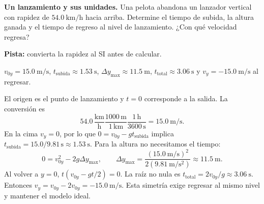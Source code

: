 \begin{ejercicio}
\textbf{Un lanzamiento y sus unidades.} Una pelota abandona un lanzador vertical con rapidez de \(\SI{54.0}{\kilo\meter\per\hour}\) hacia arriba. Determine el tiempo de subida, la altura ganada y el tiempo de regreso al nivel de lanzamiento. ¿Con qué velocidad regresa?

\textbf{Pista:} convierta la rapidez al SI antes de calcular.
\end{ejercicio}
\begin{respuesta}
\(v_{0y}=\SI{15.0}{\meter\per\second}\), \(t_{\text{subida}}\approx\SI{1.53}{\second}\), \(\Delta y_{\max}\approx\SI{11.5}{\meter}\), \(t_{\text{total}}\approx\SI{3.06}{\second}\) y \(v_y=-\SI{15.0}{\meter\per\second}\) al regresar.
\end{respuesta}
\begin{explicacion}
El origen es el punto de lanzamiento y \(t=0\) corresponde a la salida. La conversión es
\[ 54.0\,\frac{\si{\kilo\meter}}{\si{\hour}}\frac{1000\,\si{\meter}}{1\,\si{\kilo\meter}}\frac{1\,\si{\hour}}{3600\,\si{\second}}=\SI{15.0}{\meter\per\second}. \]
En la cima \(v_y=0\), por lo que \(0=v_{0y}-gt_{\text{subida}}\) implica \(t_{\text{subida}}=15.0/9.81\,\si{\second}\approx\SI{1.53}{\second}\). Para la altura no necesitamos el tiempo:
\[ 0=v_{0y}^2-2g\Delta y_{\max},\qquad \Delta y_{\max}=\frac{(\SI{15.0}{\meter\per\second})^2}{2(\SI{9.81}{\meter\per\second\squared})}\approx\SI{11.5}{\meter}. \]
Al volver a \(y=0\), \(t(v_{0y}-gt/2)=0\). La raíz no nula es \(t_{\text{total}}=2v_{0y}/g\approx\SI{3.06}{\second}\). Entonces \(v_y=v_{0y}-2v_{0y}=-\SI{15.0}{\meter\per\second}\). Esta simetría exige regresar al mismo nivel y mantener el modelo ideal.
\end{explicacion}

